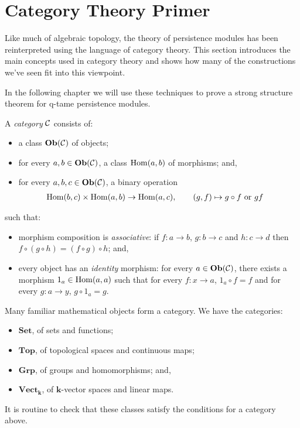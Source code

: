 \section{Category Theory Primer}
\label{section-category-theory}

Like much of algebraic topology, the theory of persistence modules has been reinterpreted using the language of category theory. This section introduces the main concepts used in category theory and shows how many of the constructions we've seen fit into this viewpoint.

In the following chapter we will use these techniques to prove a strong structure theorem for q-tame persistence modules.

\begin{definition}
A \emph{category} $\mathcal{C}$ consists of:
\begin{itemize}
\item a class $\mathbf{Ob}(\mathcal{C})$ of objects;
\item for every $a, b \in \mathbf{Ob}(\mathcal{C})$, a class $\operatorname{Hom}(a, b)$ of morphisms; and,
\item for every $a, b, c \in \mathbf{Ob}(\mathcal{C})$, a binary operation
\begin{align*}
\operatorname{Hom}(b, c) \times \operatorname{Hom}(a, b) &\to \operatorname{Hom}(a, c), \qquad (g, f) \mapsto g\circ f \text{ or } gf
\end{align*}
\end{itemize}
such that:
\begin{itemize}
\item morphism composition is \emph{associative}: if $f : a \to b$, $g : b \to c$ and $h : c \to d$ then $f \circ (g \circ h) = (f \circ g)\circ h$; and,
\item every object has an \emph{identity} morphism: for every $a \in \mathbf{Ob}(\mathcal{C})$, there exists a morphism $1_a \in \operatorname{Hom}(a, a)$ such that for every $f : x \to a$, $1_a \circ f = f$ and for every $g : a \to y$, $g \circ 1_a = g$.
\end{itemize}
\end{definition}

Many familiar mathematical objects form a category. We have the categories:
\begin{itemize}
\item $\mathbf{Set}$, of sets and functions;
\item $\mathbf{Top}$, of topological spaces and continuous maps;
\item $\mathbf{Grp}$, of groups and homomorphisms; and,
\item $\mathbf{Vect}_\mathbf{k}$, of $\mathbf{k}$-vector spaces and linear maps.
\end{itemize} 
It is routine to check that these classes satisfy the conditions for a category above.

